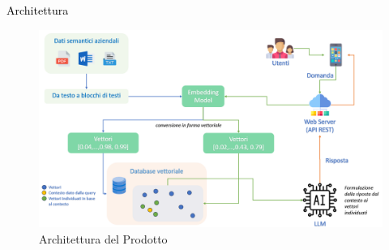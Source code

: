 \documentclass{beamer}
\begin{document}




\begin{frame}{\textcolor{black}{Architettura}}
    \begin{figure}[h]
        \centering
        \includegraphics[width=1\textwidth]{../../img/architettura.png}
        \caption{Architettura del Prodotto}
        \label{fig:architettura}
    \end{figure}
\end{frame}
\end{document}
